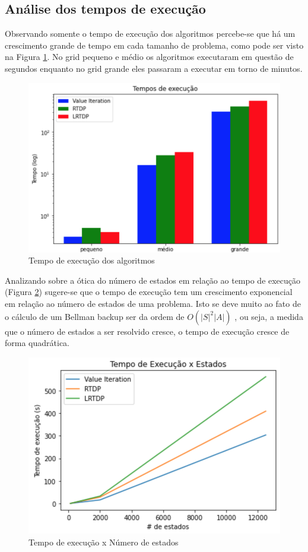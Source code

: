 \documentclass[letterpaper]{article}
\begin{document}
\subsection{Análise dos tempos de execução}

Observando somente o tempo de execução dos algoritmos percebe-se que há um crescimento grande de tempo em cada tamanho de problema, como pode ser visto na Figura \ref{fig:execution-time}. No grid pequeno e médio os algoritmos executaram em questão de segundos enquanto no grid grande eles passaram a executar em torno de minutos.

\begin{figure}[t]
    \centering
    \includegraphics[width=0.9\columnwidth]{execution-time}
    \caption{Tempo de execução dos algoritmos}
    \label{fig:execution-time}
\end{figure}

Analizando sobre a ótica do número de estados em relação ao tempo de execução (Figura \ref{fig:execution-time-vs-states}) sugere-se que o tempo de execução tem um crescimento exponencial em relação ao número de estados de uma problema. Isto se deve muito ao fato de o cálculo de um Bellman backup ser da ordem de $O(|S|^2|A|)$ \cite{MausamKolobov-2012}, ou seja, a medida que o número de estados a ser resolvido cresce, o tempo de execução cresce de forma quadrática.

\begin{figure}[t]
    \centering
    \includegraphics[width=0.9\columnwidth]{execution-time-vs-states}
    \caption{Tempo de execução x Número de estados}
    \label{fig:execution-time-vs-states}
\end{figure}
\end{document}
